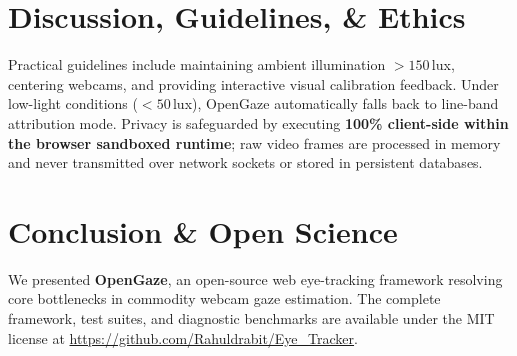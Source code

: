 \documentclass[10pt,twocolumn]{article}
\begin{document}
\section{Discussion, Guidelines, \& Ethics}
\label{sec:discussion}
Practical guidelines include maintaining ambient illumination $>150\,$lux, centering webcams, and providing interactive visual calibration feedback. Under low-light conditions ($<50\,$lux), OpenGaze automatically falls back to line-band attribution mode. Privacy is safeguarded by executing \textbf{100\% client-side within the browser sandboxed runtime}; raw video frames are processed in memory and never transmitted over network sockets or stored in persistent databases.

\section{Conclusion \& Open Science}
\label{sec:conclusion}
We presented \textbf{OpenGaze}, an open-source web eye-tracking framework resolving core bottlenecks in commodity webcam gaze estimation. The complete framework, test suites, and diagnostic benchmarks are available under the MIT license at \url{https://github.com/Rahuldrabit/Eye_Tracker}.
\end{document}
